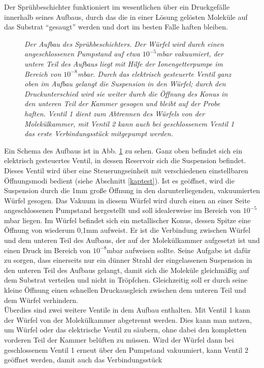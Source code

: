 Der Sprühbeschichter funktioniert im wesentlichen über ein Druckgefälle innerhalb seines Aufbaus, durch das
die in einer Lösung gelösten Moleküle auf das Substrat "`gesaugt"' werden und dort im besten
Falle haften bleiben. 
\begin{figure}
\centering
\sffamily

\caption{\textit{Der Aufbau des Sprühbeschichters.
Der Würfel wird durch einen angeschlossenen Pumpstand auf etwa $10^{-5}$mbar vakuumiert, der untere
Teil des Aufbaus liegt mit Hilfe der Ionengetterpumpe im Bereich von $10^{-8}$mbar. Durch das
elektrisch gesteuerte Ventil ganz oben im Aufbau gelangt die Suspension in den Würfel; durch den
Druckunterschied wird sie weiter durch die Öffnung des Konus in den unteren Teil der Kammer gesogen
und bleibt auf der Probe haften. Ventil 1 dient zum Abtrennen des Würfels von der Molekülkammer, mit
Ventil 2 kann auch bei geschlossenem Ventil 1 das erste Verbindungsstück mitgepumpt werden.
}}
\label{aufbau}
\end{figure}
Ein Schema des Aufbaus ist in Abb. \ref{aufbau} zu sehen. Ganz oben befindet sich ein elektrisch
gesteuertes Ventil, in dessen Reservoir sich die Suspension befindet. Dieses Ventil wird über eine
Steuerungseinheit mit verschiedenen einstellbaren Öffnungsmodi bedient (siehe Abschnitt \ref{kaptest}). Ist es
geöffnet, wird die Suspension durch die 1mm große Öffnung in den darunterliegenden, vakuumierten Würfel
gesogen. Das Vakuum in diesem Würfel wird durch einen an einer Seite angeschlossenen Pumpstand hergestellt
und soll idealerweise im Bereich von $10^{-5}$mbar liegen. Im Würfel befindet sich ein metallischer
Konus, dessen Spitze eine Öffnung von wiederum 0,1mm aufweist. Er ist die Verbindung zwischen Würfel und dem
unteren Teil des Aufbaus, der auf der Molekülkammer aufgesetzt ist und einen Druck im Bereich von
$10^{-8}$mbar aufweisen sollte.  
Seine Aufgabe ist dafür zu sorgen, dass einerseits nur ein dünner Strahl der eingelassenen Suspension in
den unteren Teil des Aufbaus gelangt, damit sich die Moleküle gleichmäßig auf dem Substrat verteilen und
nicht in Tröpfchen. Gleichzeitig soll er durch seine kleine Öffnung einen schnellen Druckausgleich zwischen
dem unteren Teil und dem Würfel verhindern. \\
Überdies sind zwei weitere Ventile in dem Aufbau enthalten. Mit Ventil 1 kann der Würfel von der
Molekülkammer abgetrennt werden. Dies kann man nutzen, um Würfel oder das elektrische Ventil zu säubern, ohne
dabei den kompletten vorderen Teil der Kammer belüften zu müssen. Wird der Würfel dann bei
geschlossenem Ventil 1 erneut über den Pumpstand vakuumiert, kann Ventil 2 geöffnet werden, damit auch das Verbindungsstück
